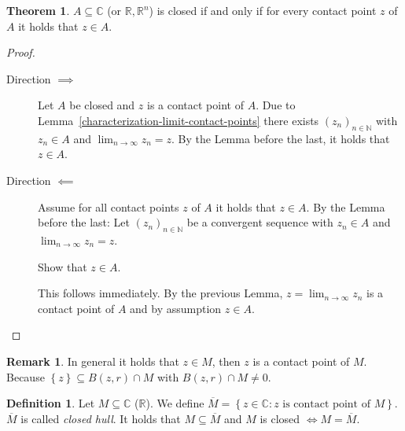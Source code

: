 \documentclass[a4paper,landscape,twocolumn]{article}
\theoremstyle{definition}
\newtheorem{theorem}{Theorem}
\newtheorem{defi}{Definition}
\newtheorem{rem}{Remark}
\newcommand\set[1]{\left\{#1\right\}}
\newcommand\seq[1]{{\left(#1\right)}_{n \in \mathbb N}}
\begin{document}
\begin{theorem}
  $A \subseteq \mathbb C$ (or $\mathbb R, \mathbb R^n$) is closed if and only if
  for every contact point $z$ of $A$ it holds that $z \in A$.
\end{theorem}
\begin{proof}
  \begin{description}
    \item[Direction $\implies$]
      Let $A$ be closed and $z$ is a contact point of $A$.
      Due to Lemma~\ref{characterization-limit-contact-points} there exists $\seq{z_n}$
      with $z_n \in A$ and $\lim_{n\to\infty} z_n = z$.
      By the Lemma before the last, it holds that $z \in A$.
    \item[Direction $\impliedby$]
      Assume for all contact points $z$ of $A$ it holds that $z \in A$.
      By the Lemma before the last: Let $\seq{z_n}$ be a convergent sequence with
      $z_n \in A$ and $\lim_{n\to\infty} z_n = z$.

      Show that $z \in A$.

      This follows immediately. By the previous Lemma,
      $z = \lim_{n\to\infty} z_n$ is a contact point of $A$
      and by assumption $z \in A$.
  \end{description}
\end{proof}
\begin{rem}
  In general it holds that $z \in M$, then $z$ is a contact point of $M$.
  Because $\set{z} \subseteq B(z, r) \cap M$ with $B(z, r) \cap M \neq 0$.
\end{rem}
\begin{defi}
  Let $M \subseteq \mathbb C$ ($\mathbb R$).
  We define $\overline{M} = \set{z \in \mathbb C: z \text{ is contact point of } M}$.
  $\overline{M}$ is called \emph{closed hull}.
  It holds that $M \subseteq \overline{M}$ and $M$ is closed
  $\iff M = \overline{M}$.
\end{defi}
\end{document}
